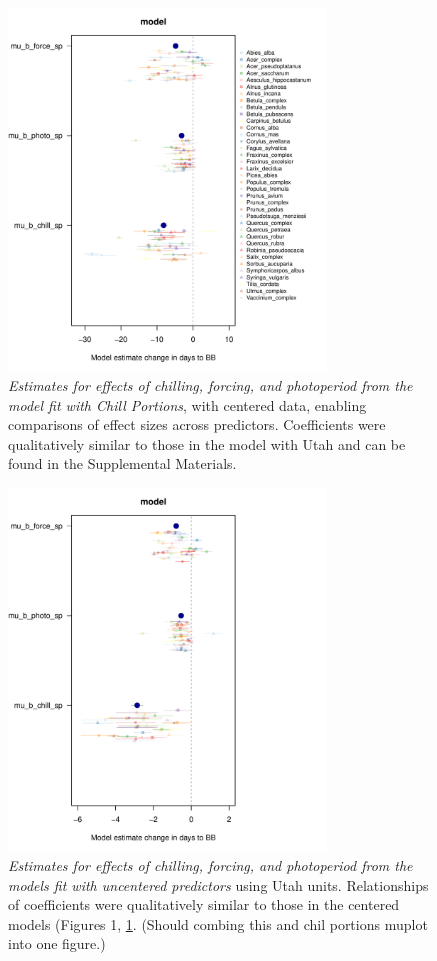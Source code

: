 \documentclass{article}
\begin{document}
\begin{figure}[h!]
\centering
\noindent \includegraphics[width=0.75\textwidth]{..//..//analyses/bb_analysis/figures/muplotmodelspcompexprampfpcp_z.pdf}
\caption{\emph{Estimates for effects of chilling, forcing, and photoperiod from the model fit with Chill Portions}, with centered data, enabling comparisons of effect sizes across predictors. Coefficients were qualitatively similar to those in the model with Utah and can be found in the Supplemental Materials.} 
\label{fig:mucpz}
\end{figure}
\begin{figure}[h!]
\centering
\noindent \includegraphics[width=0.75\textwidth]{..//..//analyses/bb_analysis/figures/muplotmodelspcompexprampfputah_nonz.pdf}
\caption{\emph{Estimates for effects of chilling, forcing, and photoperiod from the models fit with uncentered predictors} using Utah units. Relationships of coefficients were qualitatively similar to those in the centered models (Figures 1, \ref{fig:mucpz}. (Should combing this and chil portions muplot into one figure.)} 
\label{fig:muutnonz}
\end{figure}
\end{document}
